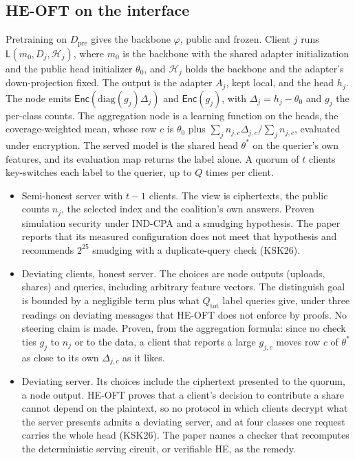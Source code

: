 \documentclass{labreport}
\newcommand{\Lf}{\mathsf{L}}
\newcommand{\Hc}{\mathcal{H}}
\newcommand{\Enc}{\mathsf{Enc}}
\newcommand{\Dpre}{D_{\mathrm{pre}}}
\begin{document}
\subsection*{HE-OFT on the interface}
Pretraining on $\Dpre$ gives the backbone $\varphi$, public and frozen. Client
$j$ runs $\Lf(m_0, D_j, \Hc_j)$, where $m_0$ is the backbone with the shared
adapter initialization and the public head initializer $\theta_0$, and $\Hc_j$
holds the backbone and the adapter's down-projection fixed. The output is the
adapter $A_j$, kept local, and the head $h_j$. The node emits
$\Enc(\mathrm{diag}(g_j)\Delta_j)$ and $\Enc(g_j)$, with
$\Delta_j = h_j - \theta_0$ and $g_j$ the per-class counts. The aggregation node
is a learning function on the heads, the coverage-weighted mean, whose row $c$
is $\theta_0$ plus $\sum_j n_{j,c}\Delta_{j,c}/\sum_j n_{j,c}$, evaluated under
encryption. The served model is the shared head $\theta^{*}$ on the querier's
own features, and its evaluation map returns the label alone. A quorum of $t$
clients key-switches each label to the querier, up to $Q$ times per client.
\begin{itemize}
\item Semi-honest server with $t-1$ clients. The view is ciphertexts, the
  public counts $n_j$, the selected index and the coalition's own answers.
  Proven simulation security under IND-CPA and a smudging hypothesis. The paper
  reports that its measured configuration does not meet that hypothesis and
  recommends $2^{25}$ smudging with a duplicate-query check (KSK26).
\item Deviating clients, honest server. The choices are node outputs (uploads,
  shares) and queries, including arbitrary feature vectors. The distinguish
  goal is bounded by a negligible term plus what $Q_{\mathrm{tot}}$ label queries
  give, under three readings on deviating messages that HE-OFT does not enforce
  by proofs. No steering claim is made. Proven, from the aggregation formula:
  since no check ties $g_j$ to $n_j$ or to the data, a client that reports a
  large $g_{j,c}$ moves row $c$ of $\theta^{*}$ as close to its own
  $\Delta_{j,c}$ as it likes.
\item Deviating server. Its choices include the ciphertext presented to the
  quorum, a node output. HE-OFT proves that a client's decision to contribute a
  share cannot depend on the plaintext, so no protocol in which clients decrypt
  what the server presents admits a deviating server, and at four classes one
  request carries the whole head (KSK26). The paper names a checker that
  recomputes the deterministic serving circuit, or verifiable HE, as the remedy.
\end{itemize}
\end{document}
